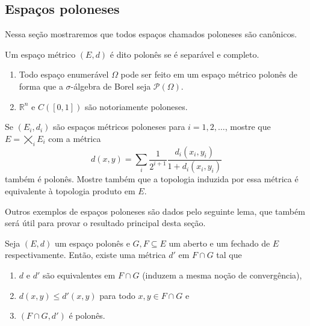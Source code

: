 \subsection{Espaços poloneses}

Nessa seção mostraremos que todos espaços chamados poloneses são canônicos.

\begin{definition}
  Um espaço métrico $(E,d)$ é dito polonês  se é separável e completo.
\end{definition}

\begin{example} \mbox{}
  \begin{enumerate}[\quad a)]
  \item Todo espaço enumerável $\Omega$ pode ser feito em um espaço métrico polonês de forma que a $\sigma$-álgebra de Borel seja $\mathcal{P}(\Omega)$.
  \item $\mathbb{R}^n$ e $C([0,1])$ são notoriamente poloneses.
  \end{enumerate}
\end{example}

\begin{exercise}
  Se $(E_i, d_i)$ são espaços métricos poloneses para $i = 1, 2, \dots$, mostre que $E = \bigtimes_i E_i$ com a métrica
  \begin{equation}
    \label{e:metrica_produto}
    d(x,y) = \sum_i \frac{1}{2^{i+1}} \frac{d_i(x_i, y_i)}{1 + d_i(x_i, y_i)}
  \end{equation}
  também é polonês.
  Mostre também que a topologia induzida por essa métrica é equivalente à topologia produto em $E$.
\end{exercise}

Outros exemplos de espaços poloneses são dados pelo seguinte lema, que também será útil para provar o resultado principal desta seção.

\begin{lemma}
  \label{l:sub_polones}
  Seja $(E,d)$ um espaço polonês e $G, F \subseteq E$ um aberto e um fechado de $E$ respectivamente.
  Então, existe uma métrica $d'$ em $F \cap G$ tal que
  \begin{enumerate}[\quad a)]
  \item $d$ e $d'$ são equivalentes em $F \cap G$ (induzem a mesma noção de convergência),
  \item $d(x,y) \leq d'(x,y)$ para todo $x, y \in F \cap G$ e
  \item $(F \cap G, d')$ é polonês.
  \end{enumerate}
\end{lemma}

